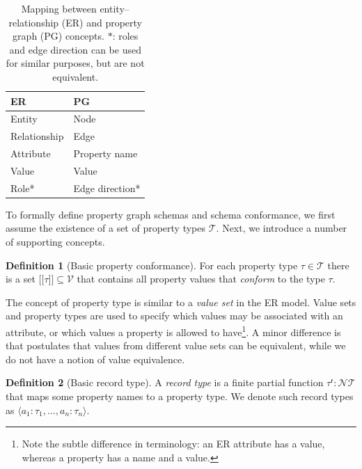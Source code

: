 \documentclass{report}
\makeatletter
\theoremstyle{definition}
\newtheorem{definition}{Definition}
\newcommand{\pto}{}%
\DeclareRobustCommand{\pto}{\mathrel{\mathpalette\p@to@gets\to}}
\newcommand{\p@to@gets}[2]{%
  \ooalign{\hidewidth$\m@th#1\mapstochar\mkern5mu$\hidewidth\cr$\m@th#1\to$\cr}%
}
\newcommand{\ptype}{\tau}
\newcommand{\ptypes}{\mathcal{T}}
\newcommand{\rtype}{\tau^\mathsf{r}}
\newcommand{\lsem}{\ensuremath{[\![}}
\newcommand{\rsem}{\ensuremath{]\!]}}
\newcommand{\sem}[1]{\ensuremath{\lsem #1 \rsem}}
\makeatother
\begin{document}
\begin{table}[t]
  \centering
  \begin{tabular}{ll}
    \hline
    \textbf{ER}  & \textbf{PG}     \\
    \hline
    Entity       & Node            \\
    Relationship & Edge            \\
    Attribute    & Property name   \\
    Value        & Value           \\
    Role*        & Edge direction* \\
    \hline
  \end{tabular}
  \caption[Mapping between entity--relationship and property graph concepts]{Mapping between entity--relationship (ER) and property graph (PG) concepts. $*$: roles and edge direction can be used for similar purposes, but are not equivalent.}
  \label{tab:er-pg}
\end{table}

To formally define property graph schemas and schema conformance, we first assume the existence of a set of property types $\mathcal{T}$. Next, we introduce a number of supporting concepts.

\begin{definition}[Basic property conformance]
  \label{def:property-conformance-basic}
  For each property type $\ptype \in \ptypes$ there is a set $\sem{\ptype} \subseteq \mathcal{V}$ that contains all property values that \emph{conform} to the type $\ptype$.
\end{definition}

The concept of property type is similar to a \emph{value set} in the ER model. Value sets and property types are used to specify which values may be associated with an attribute, or which values a property is allowed to have\footnote{Note the subtle difference in terminology: an ER attribute has a value, whereas a property has a name and a value.}. A minor difference is that \citet{chen1976entity} postulates that values from different value sets can be equivalent, while we do not have a notion of value equivalence.

\begin{definition}[Basic record type]
  \label{def:record-type-basic}
  A \emph{record type} is a finite partial function $\rtype : \mathcal{N} \pto \ptypes$ that maps some property names to a property type. We denote such record types as $\langle a_1 : \ptype_1, \ldots, a_n : \ptype_n \rangle$.
\end{definition}
\end{document}
